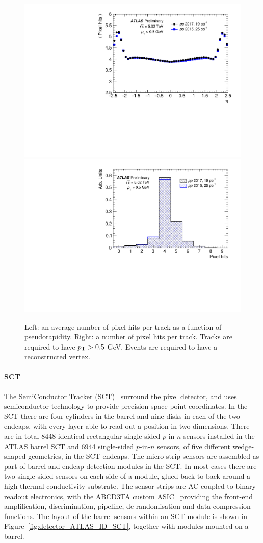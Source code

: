 \begin{figure}[H]
\centering
\includegraphics[width=.475\linewidth]{figs/chapter_detector/ATLAS_ID_pixel_hits1.pdf}
\includegraphics[width=.475\linewidth]{figs/chapter_detector/ATLAS_ID_pixel_hits2.pdf}
\caption{Left: an average number of pixel hits per track as a function of pseudorapidity. Right: a number of pixel hits per track. Tracks are required to have $p_\text{T}>0.5$ GeV. Events are required to have a reconstructed vertex.}
\label{fig:detector_ATLAS_ID_pixel_hits}
\end{figure}



\paragraph{SCT}

The SemiConductor Tracker (SCT)~\cite{Ahmad:2007zza} surround the pixel detector, and uses semiconductor technology to provide precision space-point coordinates. In the SCT there are four cylinders in the barrel and nine disks in each of the two endcaps, with every layer able to read out a position in two dimensions. There are in total 8448 identical rectangular single-sided $p$-in-$n$ sensors installed in the ATLAS barrel SCT and 6944 single-sided $p$-in-$n$ sensors, of five different wedge-shaped geometries, in the SCT endcaps. The micro strip sensors are assembled as part of barrel and endcap detection modules in the SCT. In most cases there are two single-sided sensors on each side of a module, glued back-to-back around a high thermal conductivity substrate. The sensor strips are AC-coupled to binary readout electronics, with the ABCD3TA custom ASIC~\cite{Campabadal:2005rj} providing the front-end amplification, discrimination, pipeline, de-randomisation and data compression functions. The layout of the barrel sensors within an SCT module is shown in Figure~\ref{fig:detector_ATLAS_ID_SCT}, together with modules mounted on a barrel.

